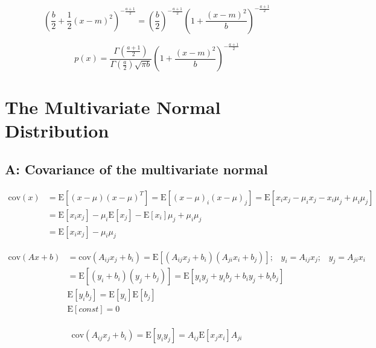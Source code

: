 \documentclass[12pt]{article}
\begin{document}
        \begin{equation}
              \left( \frac{b}{2} + \frac{1}{2} (x-m)^2\right)^{-\frac{a+1}{2}} = \left (\frac{b}{2} \right)^{-\frac{a+1}{2}} \left( 1 + \frac{(x-m)^2}{b} \right)^{-\frac{a+1}{2}}
        \end{equation}

        \begin{equation}
              p(x) = \frac{\Gamma \left( \frac{a+1}{2}\right)}{\Gamma(\frac{a}{2})\sqrt{\pi b}} \left (1 + \frac{(x-m)^2}{b}\right)^{-\frac{a+1}{2}}
        \end{equation}


    \section*{The Multivariate Normal Distribution}

    \subsection*{A: Covariance of the multivariate normal}

        \begin{align}
            \text{cov}(x) &= \text{E}[(x-\mu)(x-\mu)^T ] = \text{E}[(x-\mu)_i (x-\mu)_j] = \text{E}[ x_i x_j - \mu_i x_j - x_i \mu_j + \mu_i \mu_j] \\
                &= \text{E}[x_i x_j] - \mu_i \text{E}[x_j] - \text{E}[x_i] \mu_j + \mu_i \mu_j \\
                &= \text{E}[x_i x_j] - \mu_i \mu_j
        \end{align}

        \begin{align}
            \text{cov}(Ax+b) &= \text{cov}(A_{ij}x_j + b_i) = \text{E}[(A_{ij}x_j + b_i)(A_{ji}x_i + b_j)]; \hspace{10pt} y_i = A_{ij}x_j; \hspace{10pt} y_j = A_{ji} x_i \\
            &= \text{E}[(y_i + b_i)(y_j + b_j)] = \text{E}[y_i y_j + y_i b_j + b_i y_j + b_i b_j] \\
            &\text{E}[y_i b_j] = \text{E}[y_i] \text{E}[b_j] \\
            &\text{E}[const] = 0 \\
        \end{align}

        \begin{equation}
            \text{cov}(A_{ij}x_j + b_i) = \text{E}[y_i y_j] = A_{ij} \text{E}[x_j x_i] A_{ji}
        \end{equation}
\end{document}
